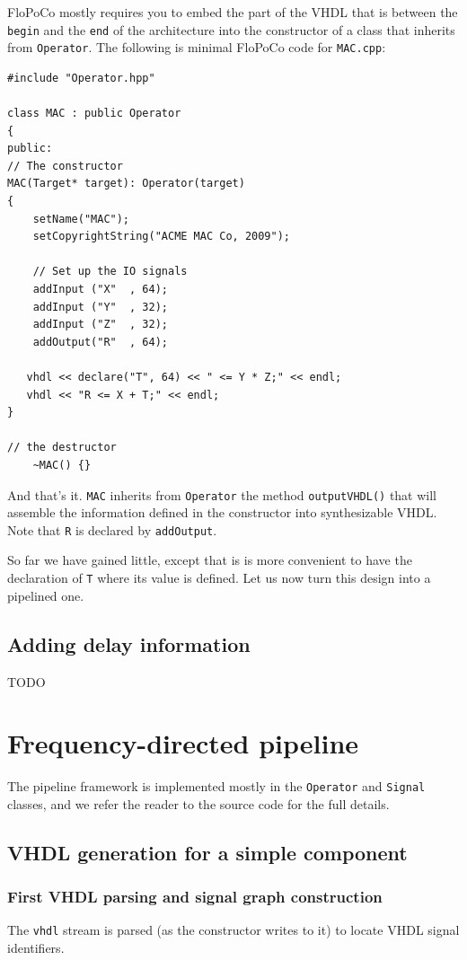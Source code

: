 \documentclass{article}
\begin{document}
FloPoCo mostly requires you to embed the part of the VHDL that is between the \texttt{begin} and the \texttt{end} of the architecture
into the constructor of a class that inherits from
\verb!Operator!. The following is minimal FloPoCo code for
\verb!MAC.cpp!:
\begin{verbatim}
#include "Operator.hpp"

class MAC : public Operator
{
public:
// The constructor
MAC(Target* target): Operator(target)
{
	setName("MAC");
	setCopyrightString("ACME MAC Co, 2009");		

	// Set up the IO signals
	addInput ("X"  , 64);
	addInput ("Y"  , 32);
	addInput ("Z"  , 32);
	addOutput("R"  , 64);

   vhdl << declare("T", 64) << " <= Y * Z;" << endl;
   vhdl << "R <= X + T;" << endl;
}

// the destructor
	~MAC() {}
\end{verbatim}
 
And that's it. \verb!MAC! inherits from \verb!Operator! the method
\verb!outputVHDL()! that will assemble the information defined in the
constructor into synthesizable VHDL. Note that \verb!R! is declared by \verb!addOutput!.

So far we have gained little, except that is is more convenient to
have the declaration of \verb!T! where its value is defined. Let us
now turn this design into a pipelined one.

\subsection{Adding delay information}
TODO

\section{Frequency-directed pipeline}

The  pipeline framework  is implemented mostly in the \texttt{Operator} and \texttt{Signal} classes, and we refer the reader to the source code for the full  details.

\subsection{VHDL generation for a simple component}

\subsubsection{First VHDL parsing and signal graph construction}
The \texttt{vhdl} stream is parsed (as the constructor writes to it) to locate VHDL signal identifiers.
\end{document}
